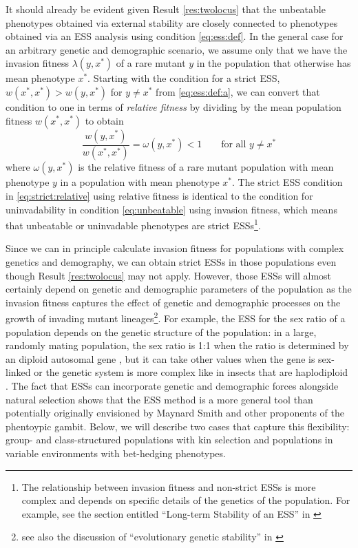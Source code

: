 \documentclass[11pt]{article}
\newcommand{\ess}[1]{#1^*}
\newcommand{\eig}{\lambda}
\begin{document}
It should already be evident given Result \ref{res:twolocus} that the unbeatable phenotypes obtained via external stability are closely connected to phenotypes obtained via an ESS analysis using condition \eqref{eq:ess:def}. In the general case for an arbitrary genetic and demographic scenario, we assume only that we have the invasion fitness $\eig(y, \ess{x})$ of a rare mutant $y$ in the population that otherwise has mean phenotype $\ess{x}$. Starting with the condition for a strict ESS, $w(\ess{x}, \ess{x}) > w(y, \ess{x})$ for $y \ne \ess{x}$ from \eqref{eq:ess:def:a}, we can convert that condition to one in terms of \textit{relative fitness} by dividing by the mean population fitness $w(\ess{x}, \ess{x})$ to obtain
\begin{equation}
  \label{eq:strict:relative}
  \frac{w(y, \ess{x})}{w(\ess{x}, \ess{x})} = \omega(y, \ess{x}) < 1 \qquad \text{for all } y \ne \ess{x}
\end{equation}
where $\omega(y, \ess{x})$ is the relative fitness of a rare mutant population with mean phenotype $y$ in a population with mean phenotype $\ess{x}$. The strict ESS condition in \eqref{eq:strict:relative} using relative fitness is identical to the condition for uninvadability in condition \eqref{eq:unbeatable} using invasion fitness, which means that unbeatable or uninvadable phenotypes are strict ESSs\footnote{The relationship between invasion fitness and non-strict ESSs is more complex and depends on specific details of the genetics of the population. For example, see the section entitled ``Long-term Stability of an ESS'' in \cite{Eshel:Feldman:1998}}.

Since we can in principle calculate invasion fitness for populations with complex genetics and demography, we can obtain strict ESSs in those populations even though Result \ref{res:twolocus} may not apply. However, those ESSs will almost certainly depend on genetic and demographic parameters of the population as the invasion fitness captures the effect of genetic and demographic processes on the growth of invading mutant lineages\footnote{see also the discussion of ``evolutionary genetic stability'' in \cite[pp. 505--506]{Eshel:1996}}. For example, the ESS for the sex ratio of a population depends on the genetic structure of the population: in a large, randomly mating population, the sex ratio is 1:1 when the ratio is determined by an diploid autosomal gene \cite{Fisher:1958,Hamilton:1967,Eshel:Feldman:1982}, but it can take other values when the gene is sex-linked or the genetic system is more complex like in insects that are haplodiploid \cite{Hamilton:1967,Eshel:Feldman:1982a}. The fact that ESSs can incorporate genetic and demographic forces alongside natural selection shows that the ESS method is a more general tool than potentially originally envisioned by Maynard Smith and other proponents of the phentoypic gambit. Below, we will describe two cases that capture this flexibility: group- and class-structured populations with kin selection and populations in variable environments with bet-hedging phenotypes.
\end{document}

